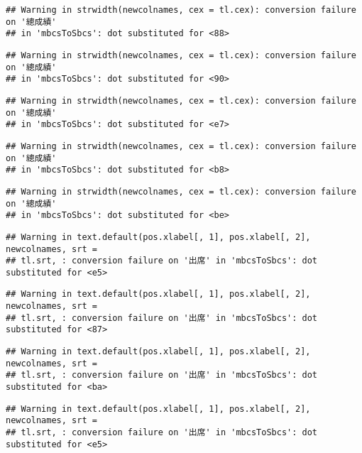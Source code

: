 \documentclass[
]{book}
\begin{document}
\begin{verbatim}
## Warning in strwidth(newcolnames, cex = tl.cex): conversion failure on '總成績'
## in 'mbcsToSbcs': dot substituted for <88>
\end{verbatim}

\begin{verbatim}
## Warning in strwidth(newcolnames, cex = tl.cex): conversion failure on '總成績'
## in 'mbcsToSbcs': dot substituted for <90>
\end{verbatim}

\begin{verbatim}
## Warning in strwidth(newcolnames, cex = tl.cex): conversion failure on '總成績'
## in 'mbcsToSbcs': dot substituted for <e7>
\end{verbatim}

\begin{verbatim}
## Warning in strwidth(newcolnames, cex = tl.cex): conversion failure on '總成績'
## in 'mbcsToSbcs': dot substituted for <b8>
\end{verbatim}

\begin{verbatim}
## Warning in strwidth(newcolnames, cex = tl.cex): conversion failure on '總成績'
## in 'mbcsToSbcs': dot substituted for <be>
\end{verbatim}

\begin{verbatim}
## Warning in text.default(pos.xlabel[, 1], pos.xlabel[, 2], newcolnames, srt =
## tl.srt, : conversion failure on '出席' in 'mbcsToSbcs': dot substituted for <e5>
\end{verbatim}

\begin{verbatim}
## Warning in text.default(pos.xlabel[, 1], pos.xlabel[, 2], newcolnames, srt =
## tl.srt, : conversion failure on '出席' in 'mbcsToSbcs': dot substituted for <87>
\end{verbatim}

\begin{verbatim}
## Warning in text.default(pos.xlabel[, 1], pos.xlabel[, 2], newcolnames, srt =
## tl.srt, : conversion failure on '出席' in 'mbcsToSbcs': dot substituted for <ba>
\end{verbatim}

\begin{verbatim}
## Warning in text.default(pos.xlabel[, 1], pos.xlabel[, 2], newcolnames, srt =
## tl.srt, : conversion failure on '出席' in 'mbcsToSbcs': dot substituted for <e5>
\end{verbatim}
\end{document}
